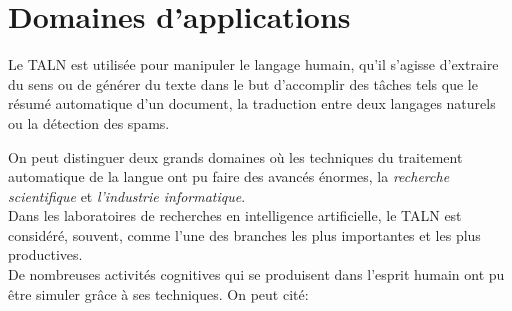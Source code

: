 \section{Domaines d'applications}
Le TALN est utilisée pour manipuler le langage humain, qu'il s'agisse d'extraire du sens ou de générer du texte dans le but d'accomplir des tâches tels que le résumé automatique d'un document, la traduction entre deux langages naturels ou la détection des spams.

On peut distinguer deux grands domaines où les techniques du traitement automatique de la langue ont pu faire des avancés énormes, la \emph{recherche scientifique} et \emph{l'industrie informatique}.\\
Dans les laboratoires de recherches en intelligence artificielle, le TALN est considéré, souvent, comme l'une des branches les plus importantes et les plus productives.\\ 
De nombreuses activités cognitives qui se produisent dans l'esprit humain ont pu être simuler grâce à ses techniques.
On peut cité: 
